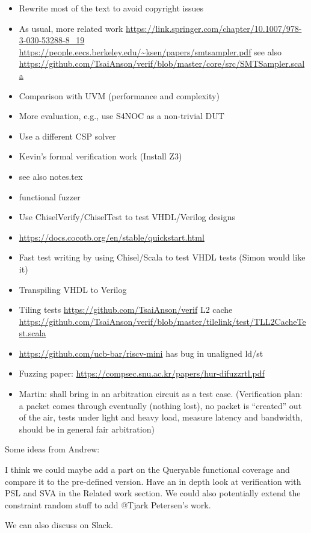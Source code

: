 \documentclass[conference]{IEEEtran}
\newcommand{\martin}[1]{{\color{blue} Martin: #1}}
\begin{document}
\begin{itemize}
\item Rewrite most of the text to avoid copyright issues
\item As usual, more related work \url{https://link.springer.com/chapter/10.1007/978-3-030-53288-8_19} \url{https://people.eecs.berkeley.edu/~ksen/papers/smtsampler.pdf} see also \url{https://github.com/TsaiAnson/verif/blob/master/core/src/SMTSampler.scala}
\item Comparison with UVM (performance and complexity)
\item More evaluation, e.g., use S4NOC as a non-trivial DUT
\item Use a different CSP solver
\item Kevin's formal verification work (Install Z3)
\item see also notes.tex
\item functional fuzzer
\item Use ChiselVerify/ChiselTest to test VHDL/Verilog designs
\item \url{https://docs.cocotb.org/en/stable/quickstart.html}
\item Fast test writing by using Chisel/Scala to test VHDL tests (Simon would like it)
\item Transpiling VHDL to Verilog
\item Tiling tests \url{https://github.com/TsaiAnson/verif} L2 cache \url{https://github.com/TsaiAnson/verif/blob/master/tilelink/test/TLL2CacheTest.scala}
\item \url{https://github.com/ucb-bar/riscv-mini} has bug in unaligned ld/st
\item Fuzzing paper: \url{https://compsec.snu.ac.kr/papers/hur-difuzzrtl.pdf}
\item \martin{shall bring in an arbitration circuit as a test case.} (Verification plan: a packet comes through eventually (nothing lost), no packet is ``created'' out of the air, tests under light and heavy load, measure latency and bandwidth, should be in general fair arbitration)
\end{itemize}

Some ideas from Andrew:

I think we could maybe add a part on the Queryable functional coverage and compare it to the pre-defined version. Have an in depth look at verification with PSL and SVA in the Related work section. We could also potentially extend the constraint random stuff to add @Tjark Petersen's work.

We can also discuss on Slack.
\end{document}

